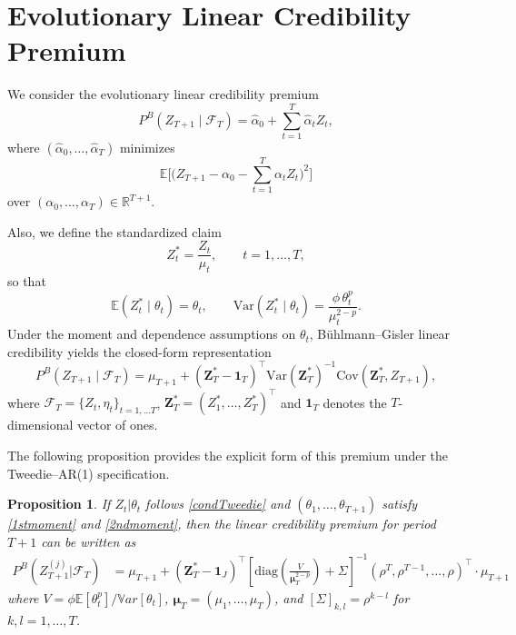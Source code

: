 \documentclass{sfuthesis}
\numberwithin{equation}{chapter}
\newtheorem{proposition}{Proposition}
\begin{document}
\section{Evolutionary Linear Credibility Premium}
\label{subsec:credibility}

We consider the evolutionary linear credibility premium
\[
P^B(Z_{T+1} \mid \mathcal{F}_T)
= \widehat{\alpha}_0 + \sum_{t=1}^T \widehat{\alpha}_t Z_t,
\]
where \((\widehat{\alpha}_0,\ldots,\widehat{\alpha}_T)\) minimizes
\[
\mathbb{E}\Big[\big(Z_{T+1} - \alpha_0 - \sum_{t=1}^T \alpha_t Z_t\big)^2\Big]
\]
over \((\alpha_0,\ldots,\alpha_T) \in \mathbb{R}^{T+1}\).

Also, we define the standardized claim 
\[
Z_t^* = \frac{Z_t}{\mu_t}, \qquad t=1,\dots,T,
\]
so that
\[
\mathbb{E}(Z_t^* \mid \theta_t)=\theta_t,
\qquad
\mathrm{Var}(Z_t^* \mid \theta_t)=\frac{\phi\,\theta_t^p}{\mu_t^{2-p}}.
\]
Under the moment and dependence assumptions on \(\theta_t\), Bühlmann–Gisler linear credibility yields the closed-form representation
\[
P^B(Z_{T+1} \mid \mathcal{F}_T)
=
\mu_{T+1}
+
(\bm{Z}_T^* - \mathbf{1}_T)^\top
\mathrm{Var}(\bm{Z}_T^*)^{-1}
\mathrm{Cov}(\bm{Z}_T^*, Z_{T+1}),
\]
where \( \mathcal{F}_T = \{ Z_{t} , \eta_t \}_{t=1,...T} \), \(\bm{Z}_T^* = (Z_1^*, \ldots, Z_T^*)^\top\) and \(\mathbf{1}_T\) denotes the \(T\)-dimensional vector of ones.


The following proposition provides the explicit form of this premium under the Tweedie–AR(1) specification.

\begin{proposition} If $Z_{t}|\theta_{t}$ follows \eqref{condTweedie} and $(\theta_1, \ldots, \theta_{T+1})$ satisfy \eqref{1stmoment} and \eqref{2ndmoment}, then the linear credibility premium for period $T+1$ can be written as
\begin{equation} \label{tweediecredS}
\begin{aligned}
P^B(Z_{T+1}^{(j)}|\mathcal{F}_T)&=\mu_{T+1}+(\bm{Z}_{T }^{*}-\bm{1}_J)^\top\left[ \text{diag} \left( \frac{V}{\bm{\mu}_T^{2-p}} \right) + \Sigma \right]^{-1} (\rho^T, \rho^{T-1}, \ldots, \rho)^\top \cdot \mu_{T+1} 
\end{aligned}
\end{equation}
where $V=\phi\mathbb{E}[\theta_{t}^{p}]/\mathbb{V}ar[\theta_t]$, $\bm{\mu}_T=(\mu_1, \ldots, \mu_T)$, and $[\Sigma ]_{k,l}=\rho^{k-l}$ for $k,l=1 ,\ldots, T$.
\end{proposition}
\end{document}
